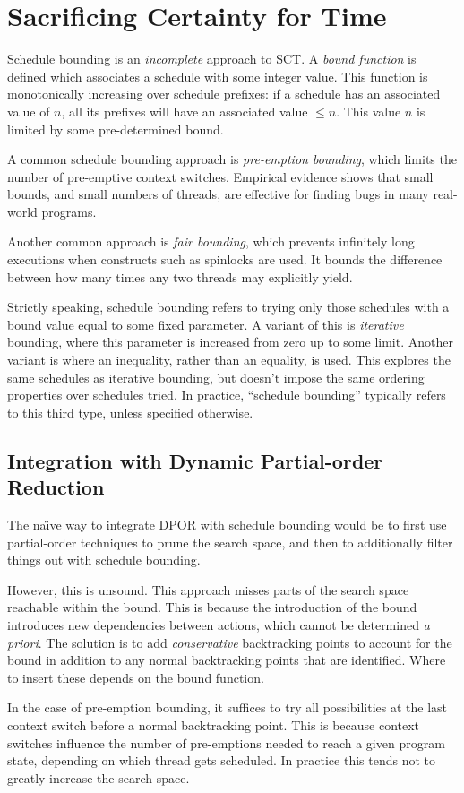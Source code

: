 \section{Sacrificing Certainty for Time}
\label{sec:sct-incomplete}

Schedule bounding\cite{emmi2011,musuvathi2008,musuvathi2007} is an
\emph{incomplete} approach to SCT\@.  A \emph{bound function} is defined which
associates a schedule with some integer value.  This function is monotonically
increasing over schedule prefixes: if a schedule has an associated value of $n$,
all its prefixes will have an associated value $\leq n$.  This value $n$ is
limited by some pre-determined bound.

A common schedule bounding approach is \emph{pre-emption
  bounding}\cite{musuvathi2007}, which limits the number of pre-emptive context
switches.  Empirical evidence\cite{thomson2014} shows that small bounds, and
small numbers of threads, are effective for finding bugs in many real-world
programs.

Another common approach is \emph{fair bounding}\cite{musuvathi2008}, which
prevents infinitely long executions when constructs such as spinlocks are used.
It bounds the difference between how many times any two threads may explicitly
yield.

Strictly speaking, schedule bounding refers to trying only those schedules with
a bound value equal to some fixed parameter.  A variant of this is
\emph{iterative} bounding, where this parameter is increased from zero up to
some limit.  Another variant is where an inequality, rather than an equality, is
used.  This explores the same schedules as iterative bounding, but doesn't
impose the same ordering properties over schedules tried.  In practice,
``schedule bounding'' typically refers to this third type, unless specified
otherwise.

\subsection{Integration with Dynamic Partial-order Reduction}

The na\"{\i}ve way to integrate DPOR with schedule bounding would be
to first use partial-order techniques to prune the search space, and
then to additionally filter things out with schedule bounding.

However, this is unsound.  This approach misses parts of the search space
reachable within the bound.  This is because the introduction of the bound
introduces new dependencies between actions, which cannot be determined \emph{a
  priori}.  The solution is to add \emph{conservative} backtracking points to
account for the bound in addition to any normal backtracking points that are
identified.  Where to insert these depends on the bound function.

In the case of pre-emption bounding, it suffices to try all possibilities at the
last context switch before a normal backtracking point.  This is because context
switches influence the number of pre-emptions needed to reach a given program
state, depending on which thread gets scheduled.  In practice this tends not to
greatly increase the search space.
